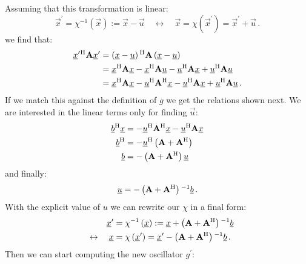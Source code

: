 \documentclass[a4paper,10pt]{article}
\begin{document}
Assuming that this transformation is linear:
\begin{equation}
 \vec{x}^{\prime} = \chi^{-1}\left(\vec{x}\right) := \vec{x} - \vec{u}
 \quad \leftrightarrow \quad
 \vec{x} = \chi\left(\vec{x}^{\prime}\right) = \vec{x}^{\prime} + \vec{u} \,.
\end{equation}
we find that:
\begin{equation}
\begin{split}
  \underline{x}^{\prime}{}^{\textnormal{H}} \mathbf{A} \underline{x}^{\prime}
  & = \left(\underline{x}-\underline{u}\right){}^{\textnormal{H}} \mathbf{A} \left(\underline{x}-\underline{u}\right) \\
  & = \underline{x}{}^{\textnormal{H}} \mathbf{A} \underline{x} - \underline{x}{}^{\textnormal{H}} \mathbf{A} \underline{u} -
      \underline{u}{}^{\textnormal{H}} \mathbf{A} \underline{x} + \underline{u}{}^{\textnormal{H}} \mathbf{A} \underline{u} \\
  & = \underline{x}{}^{\textnormal{H}} \mathbf{A} \underline{x} - \underline{u}{}^{\textnormal{H}} \mathbf{A}{}^{\textnormal{H}} \underline{x} -
      \underline{u}{}^{\textnormal{H}} \mathbf{A} \underline{x} + \underline{u}{}^{\textnormal{H}} \mathbf{A} \underline{u} \,.
\end{split}
\end{equation}
If we match this against the definition of $g$ we get the
relations shown next. We are interested in the linear terms
only for finding $\vec{u}$:
\begin{equation}
\begin{split}
  \underline{b}{}^{\textnormal{H}} \underline{x} & = - \underline{u}{}^{\textnormal{H}} \mathbf{A}{}^{\textnormal{H}} \underline{x} - \underline{u}{}^{\textnormal{H}} \mathbf{A} \underline{x} \\
  \underline{b}{}^{\textnormal{H}}         & = - \underline{u}{}^{\textnormal{H}} \left(\mathbf{A} + \mathbf{A}{}^{\textnormal{H}}\right) \\
  \underline{b}           & = - \left(\mathbf{A} + \mathbf{A}{}^{\textnormal{H}}\right) \underline{u} \\
\end{split}
\end{equation}
and finally:
\begin{equation}
  \underline{u} = - \left(\mathbf{A} + \mathbf{A}{}^{\textnormal{H}}\right){}^{-1} \underline{b} \,.
\end{equation}
With the explicit value of $u$ we can rewrite our $\chi$ in a final form:
\begin{equation}\label{eq:transform_chi}
\begin{split}
 \underline{x}^{\prime} & = \chi^{-1}\left(\underline{x}\right) := \underline{x} + \left(\mathbf{A} + \mathbf{A}{}^{\textnormal{H}}\right){}^{-1} \underline{b} \\
 \quad \leftrightarrow \quad
 \underline{x} & = \chi\left(\underline{x}^{\prime}\right) = \underline{x}^{\prime} - \left(\mathbf{A} + \mathbf{A}{}^{\textnormal{H}}\right){}^{-1} \underline{b} \,.
\end{split}
\end{equation}
Then we can start computing the new oscillator $g^{\prime}$:
\end{document}
